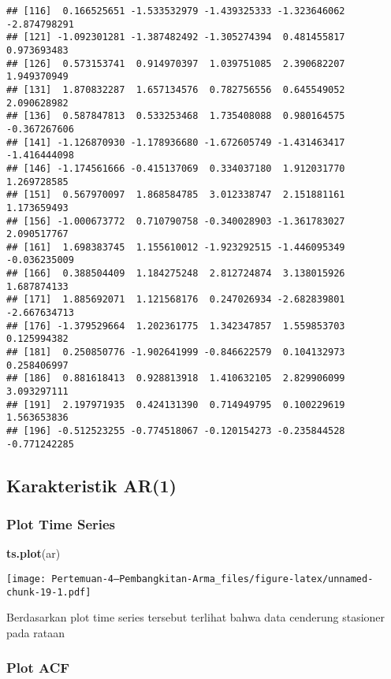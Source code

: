 \documentclass[
]{article}
\newenvironment{Shaded}{\begin{snugshade}}{\end{snugshade}}
\newcommand{\FunctionTok}[1]{\textcolor[rgb]{0.13,0.29,0.53}{\textbf{#1}}}
\newcommand{\NormalTok}[1]{#1}
\begin{document}
\begin{verbatim}
## [116]  0.166525651 -1.533532979 -1.439325333 -1.323646062 -2.874798291
## [121] -1.092301281 -1.387482492 -1.305274394  0.481455817  0.973693483
## [126]  0.573153741  0.914970397  1.039751085  2.390682207  1.949370949
## [131]  1.870832287  1.657134576  0.782756556  0.645549052  2.090628982
## [136]  0.587847813  0.533253468  1.735408088  0.980164575 -0.367267606
## [141] -1.126870930 -1.178936680 -1.672605749 -1.431463417 -1.416444098
## [146] -1.174561666 -0.415137069  0.334037180  1.912031770  1.269728585
## [151]  0.567970097  1.868584785  3.012338747  2.151881161  1.173659493
## [156] -1.000673772  0.710790758 -0.340028903 -1.361783027  2.090517767
## [161]  1.698383745  1.155610012 -1.923292515 -1.446095349 -0.036235009
## [166]  0.388504409  1.184275248  2.812724874  3.138015926  1.687874133
## [171]  1.885692071  1.121568176  0.247026934 -2.682839801 -2.667634713
## [176] -1.379529664  1.202361775  1.342347857  1.559853703  0.125994382
## [181]  0.250850776 -1.902641999 -0.846622579  0.104132973  0.258406997
## [186]  0.881618413  0.928813918  1.410632105  2.829906099  3.093297111
## [191]  2.197971935  0.424131390  0.714949795  0.100229619  1.563653836
## [196] -0.512523255 -0.774518067 -0.120154273 -0.235844528 -0.771242285
\end{verbatim}

\subsection{Karakteristik AR(1)}\label{karakteristik-ar1}

\subsubsection{Plot Time Series}\label{plot-time-series-1}

\begin{Shaded}
\begin{Highlighting}[]
\FunctionTok{ts.plot}\NormalTok{(ar)}
\end{Highlighting}
\end{Shaded}

\texttt{[image: Pertemuan-4---Pembangkitan-Arma\_files/figure-latex/unnamed-chunk-19-1.pdf]}

Berdasarkan plot time series tersebut terlihat bahwa data cenderung
stasioner pada rataan

\subsubsection{Plot ACF}\label{plot-acf-1}
\end{document}

